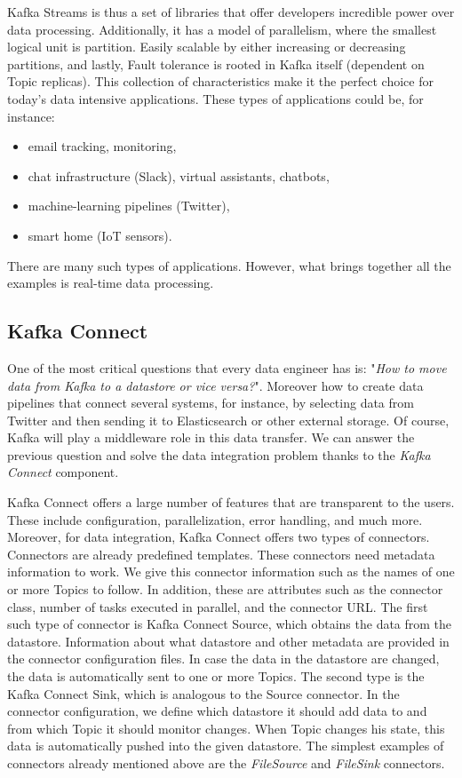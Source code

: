 Kafka Streams is thus a set of libraries that offer developers incredible power over data processing.
Additionally, it has a model of parallelism, where the smallest logical unit is partition.
Easily scalable by either increasing or decreasing partitions, and lastly, Fault tolerance is rooted in Kafka itself (dependent on Topic replicas).
This collection of characteristics make it the perfect choice for today's data intensive applications.
These types of applications could be, for instance:
\begin{itemize}[itemsep=1mm, parsep=0pt]
    \item email tracking, monitoring,
    \item chat infrastructure (Slack), virtual assistants, chatbots,
    \item machine-learning pipelines (Twitter),
    \item smart home (IoT sensors).
\end{itemize}
There are many such types of applications.
However, what brings together all the examples is real-time data processing.

\subsection{Kafka Connect}

One of the most critical questions that every data engineer has is: "\emph{How to move data from Kafka to a datastore or vice versa?}".
Moreover how to create data pipelines that connect several systems, for instance, by selecting data from Twitter and then sending it to Elasticsearch or other external storage.
Of course, Kafka will play a middleware role in this data transfer.
We can answer the previous question and solve the data integration problem thanks to the \emph{Kafka Connect} component.

Kafka Connect offers a large number of features that are transparent to the users.
These include configuration, parallelization, error handling, and much more.
Moreover, for data integration, Kafka Connect offers two types of connectors.
Connectors are already predefined templates.
These connectors need metadata information to work.
We give this connector information such as the names of one or more Topics to follow.
In addition, these are attributes such as the connector class, number of tasks executed in parallel, and the connector URL.
The first such type of connector is Kafka Connect Source, which obtains the data from the datastore.
Information about what datastore and other metadata are provided in the connector configuration files.
In case the data in the datastore are changed, the data is automatically sent to one or more Topics.
The second type is the Kafka Connect Sink, which is analogous to the Source connector.
In the connector configuration, we define which datastore it should add data to and from which Topic it should monitor changes.
When Topic changes his state, this data is automatically pushed into the given datastore.
The simplest examples of connectors already mentioned above are the \emph{FileSource} and \emph{FileSink} connectors.

